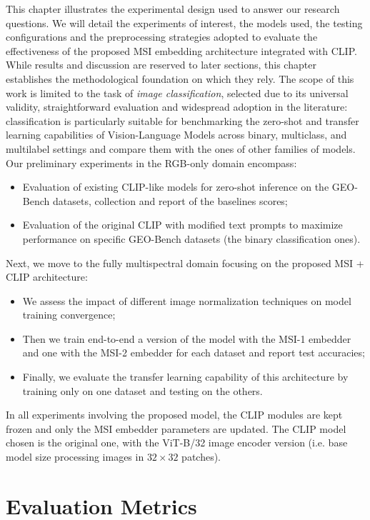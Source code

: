 \documentclass[a4paper, oneside, english]{sapthesis} %
\begin{document}
This chapter illustrates the experimental design used to answer our research questions. We will detail the experiments of interest, the models used, the testing configurations and the preprocessing strategies adopted to evaluate the effectiveness of the proposed MSI embedding architecture integrated with CLIP. While results and discussion are reserved to later sections, this chapter establishes the methodological foundation on which they rely.
The scope of this work is limited to the task of \emph{image classification}, selected due to its universal validity, straightforward evaluation and widespread adoption in the literature: classification is particularly suitable for benchmarking the zero-shot and transfer learning capabilities of Vision-Language Models across binary, multiclass, and multilabel settings and compare them with the ones of other families of models. Our preliminary experiments in the RGB-only domain encompass:
\begin{itemize}
    \item Evaluation of existing CLIP-like models for zero-shot inference on the GEO-Bench datasets, collection and report of the baselines scores;
    \item Evaluation of the original CLIP with modified text prompts to maximize performance on specific GEO-Bench datasets (the binary classification ones).
\end{itemize}
Next, we move to the fully multispectral domain focusing on the proposed MSI + CLIP architecture:
\begin{itemize}
    \item We assess the impact of different image normalization techniques on model training convergence;
    \item Then we train end-to-end a version of the model with the MSI-1 embedder and one with the MSI-2 embedder for each dataset and report test accuracies;
    \item Finally, we evaluate the transfer learning capability of this architecture by training only on one dataset and testing on the others.
\end{itemize}  
In all experiments involving the proposed model, the CLIP modules are kept frozen and only the MSI embedder parameters are updated. The CLIP model chosen is the original one, with the ViT-B/32 image encoder version (i.e. base model size processing images in $32\times32$ patches).


\section{Evaluation Metrics}
\end{document}
